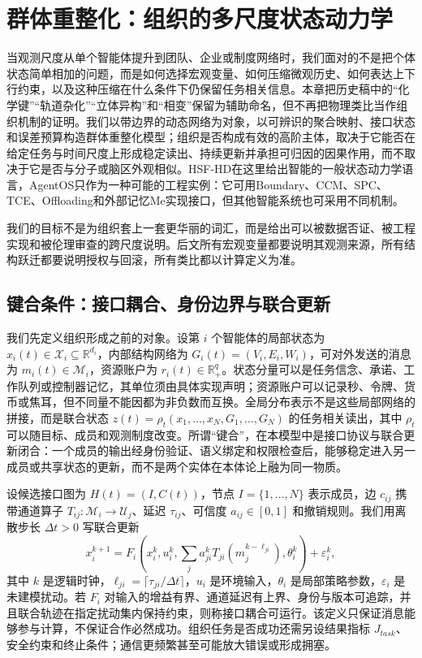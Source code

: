 \chapter{群体重整化：组织的多尺度状态动力学}
\label{chp:collective_renorm_ch}

当观测尺度从单个智能体提升到团队、企业或制度网络时，我们面对的不是把个体状态简单相加的问题，而是如何选择宏观变量、如何压缩微观历史、如何表达上下行约束，以及这种压缩在什么条件下仍保留任务相关信息。本章把历史稿中的“化学键”“轨道杂化”“立体异构”和“相变”保留为辅助命名，但不再把物理类比当作组织机制的证明。我们以带边界的动态网络为对象，以可辨识的聚合映射、接口状态和误差预算构造群体重整化模型；组织是否构成有效的高阶主体，取决于它能否在给定任务与时间尺度上形成稳定读出、持续更新并承担可归因的因果作用，而不取决于它是否与分子或脑区外观相似。HSF-HD在这里给出智能的一般状态动力学语言，AgentOS只作为一种可能的工程实例：它可用Boundary、CCM、SPC、TCE、Offloading和外部记忆Me实现接口，但其他智能系统也可采用不同机制。

我们的目标不是为组织套上一套更华丽的词汇，而是给出可以被数据否证、被工程实现和被伦理审查的跨尺度说明。后文所有宏观变量都要说明其观测来源，所有结构跃迁都要说明授权与回滚，所有类比都以计算定义为准。

\section{键合条件：接口耦合、身份边界与联合更新}
\label{sec:section_3381}

我们先定义组织形成之前的对象。设第 $i$ 个智能体的局部状态为 $x_i(t)\in\mathcal X_i\subseteq\mathbb R^{d_i}$，内部结构网络为 $G_i(t)=(V_i,E_i,W_i)$，可对外发送的消息为 $m_i(t)\in\mathcal M_i$，资源账户为 $r_i(t)\in\mathbb R_+^{q}$。状态分量可以是任务信念、承诺、工作队列或控制器记忆，其单位须由具体实现声明；资源账户可以记录秒、令牌、货币或焦耳，但不同量不能因都为非负数而互换。全局分布表示不是这些局部网络的拼接，而是联合状态 $z(t)=\rho_t(x_1,\ldots,x_N,G_1,\ldots,G_N)$ 的任务相关读出，其中 $\rho_t$ 可以随目标、成员和观测制度改变。所谓“键合”，在本模型中是接口协议与联合更新闭合：一个成员的输出经身份验证、语义绑定和权限检查后，能够稳定进入另一成员或共享状态的更新，而不是两个实体在本体论上融为同一物质。

设候选接口图为 $H(t)=(I,C(t))$，节点 $I=\{1,\ldots,N\}$ 表示成员，边 $c_{ij}$ 携带通道算子 $T_{ij}:\mathcal M_i\rightarrow\mathcal U_j$、延迟 $\tau_{ij}$、可信度 $a_{ij}\in[0,1]$ 和撤销规则。我们用离散步长 $\Delta t>0$ 写联合更新
\begin{equation}
x_i^{k+1}=F_i\!\left(x_i^k,u_i^k,\sum_j a_{ji}^kT_{ji}(m_j^{k-\ell_{ji}}),\theta_i^k\right)+\varepsilon_i^k,
\end{equation}
其中 $k$ 是逻辑时钟，$\ell_{ji}=\lceil\tau_{ji}/\Delta t\rceil$，$u_i$ 是环境输入，$\theta_i$ 是局部策略参数，$\varepsilon_i$ 是未建模扰动。若 $F_i$ 对输入的增益有界、通道延迟有上界、身份与版本可追踪，并且联合轨迹在指定扰动集内保持约束，则称接口耦合可运行。该定义只保证消息能够参与计算，不保证合作必然成功。组织任务是否成功还需另设结果指标 $J_{task}$、安全约束和终止条件；通信更频繁甚至可能放大错误或形成拥塞。

